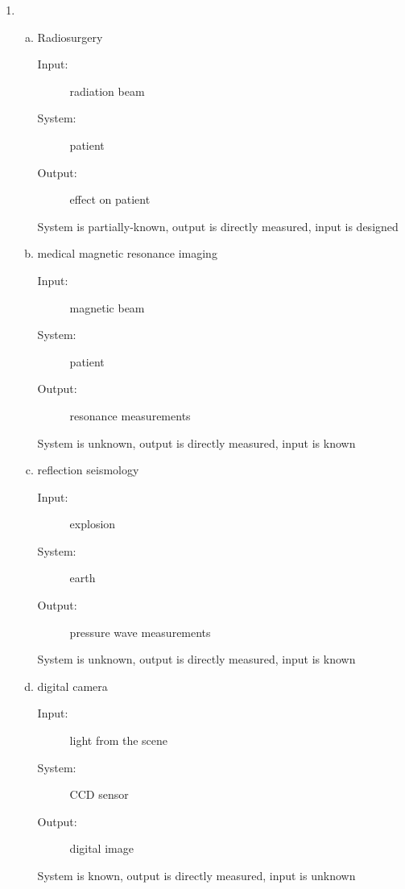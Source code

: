 \documentclass[10pt, letterpaper]{article}
\begin{document}
\begin{enumerate}[1)]  %

\item
    \begin{enumerate}[a.]
    \item Radiosurgery
        \begin{description}
            \item[Input:] radiation beam
            \item[System:] patient
            \item[Output:] effect on patient
        \end{description}

        System is partially-known, output is directly measured, input is designed

    \item medical magnetic resonance imaging
        \begin{description}
            \item[Input:] magnetic beam
            \item[System:] patient
            \item[Output:] resonance measurements
        \end{description}

        System is unknown, output is directly measured, input is known

    \item reflection seismology
        \begin{description}
            \item[Input:] explosion
            \item[System:] earth
            \item[Output:] pressure wave measurements
        \end{description}

        System is unknown, output is directly measured, input is known

    \item digital camera
        \begin{description}
            \item[Input:] light from the scene
            \item[System:] CCD sensor
            \item[Output:] digital image
        \end{description}

        System is known, output is directly measured, input is unknown


\end{enumerate}
\end{enumerate}
\end{document}
